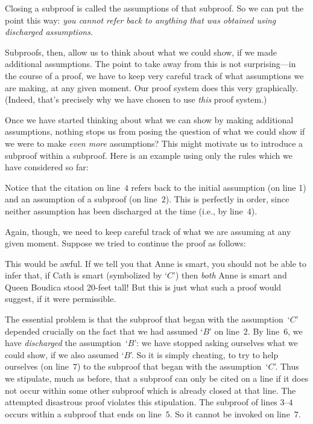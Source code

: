 Closing a subproof is called  the assumptions of that subproof. So we can put the point this way: \emph{you cannot refer back to anything that was obtained using discharged assumptions}. 

Subproofs, then, allow us to think about what we could show, if we made additional assumptions. The point to take away from this is not surprising---in the course of a proof, we have to keep very careful track of what assumptions we are making, at any given moment. Our proof system does this very graphically. (Indeed, that's precisely why we have chosen to use \emph{this} proof system.)

Once we have started thinking about what we can show by making additional assumptions, nothing stops us from posing the question of what we could show if we were to make \emph{even more} assumptions? This might motivate us to introduce a subproof within a subproof. Here is an example using only the rules which we have considered so far: 
\begin{fitchproof}
\open
	\open
	\close
\close
{}
\end{fitchproof}
Notice that the citation on line~$4$ refers back to the initial assumption (on line 1) and an assumption of a subproof (on line~$2$). This is perfectly in order, since neither assumption has been discharged at the time (i.e., by line~$4$).

Again, though, we need to keep careful track of what we are assuming at any given moment. Suppose we tried to continue the proof as follows:
\begin{fitchproof}
\open
	\open
	\close
\close
{}
 
\end{fitchproof}
This would be awful. If we tell you that Anne is smart, you should not be able to infer that, if Cath is smart (symbolized by `$C$') then \emph{both} Anne is smart and Queen Boudica stood 20-feet tall! But this is just what such a proof would suggest, if it were permissible.

The essential problem is that the subproof that began with the assumption~`$C$' depended crucially on the fact that we had assumed `$B$' on line~$2$. By line~$6$, we have \emph{discharged} the assumption~`$B$': we have stopped asking ourselves what we could show, if we also assumed `$B$'. So it is simply cheating, to try to help ourselves (on line~$7$) to the subproof that began with the assumption~`$C$'. Thus we stipulate, much as before, that a subproof can only be cited on a line if it does not occur within some other subproof which is already closed at that line. The attempted disastrous proof violates this stipulation. The subproof of lines $3$--$4$ occurs within a subproof that ends on line~$5$. So it cannot be invoked on line~$7$.

